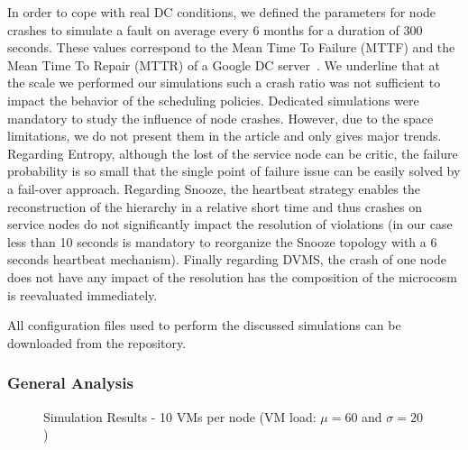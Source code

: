 In order to cope with real DC conditions, we defined the parameters
for node crashes to simulate a fault on average every 6 months for a
duration of 300 seconds. These values correspond to the Mean Time To
Failure (MTTF) and the Mean Time To Repair (MTTR) of a Google DC
server~\cite[pp. 107-108]{datacenterAsComputer}. We underline that at
the scale we performed our simulations such a crash ratio was not
sufficient to impact the behavior of the scheduling policies.
Dedicated simulations were mandatory to study the influence of node
crashes. However, due to the space limitations, we do not present them
in the article and only gives major trends.
 Regarding Entropy,
although the lost of the service node can be critic, the failure
probability is so small that the single point of failure issue can be
easily solved by a fail-over approach. Regarding Snooze, the heartbeat
strategy enables the reconstruction of the hierarchy in a relative
short time and thus crashes on service nodes do not significantly
impact the resolution of violations (in our case less than 10 seconds
is mandatory to reorganize the Snooze topology with a 6 seconds
heartbeat mechanism). Finally regarding DVMS, the crash of one node
does not have any impact of the resolution has the composition of the
microcosm is reevaluated immediately.


All configuration files used to perform the discussed simulations can
be downloaded from the \vmps repository.

\subsubsection{General  Analysis}
\label{subsec:general-comparison}

\begin{figure}
\subcapcentertrue
{}
\caption{Simulation Results - 10 VMs per node (VM load: $\mu=60$ and $\sigma=20$)}
\label{fig:simulation-overview}
\end{figure}

